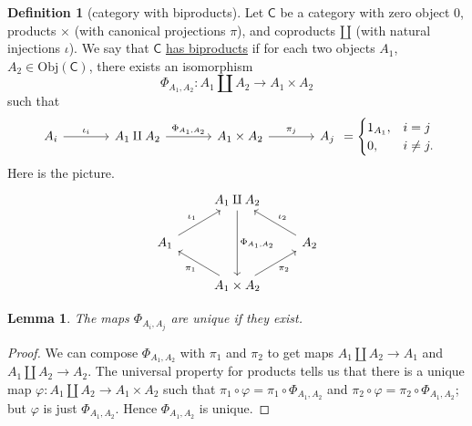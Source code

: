 \documentclass[a4paper]{report}
\newcommand{\defn}[1]{\ul{#1}}
\newcommand{\Obj}{\mathrm{Obj}}
\theoremstyle{definition}
\newtheorem{definition}{Definition}[section]
\theoremstyle{plain}
\newtheorem{lemma}{Lemma}[section]
\theoremstyle{remark}
\begin{document}
\begin{definition}[category with biproducts]
  \label{def:categorywithbiproducts}
  Let $\mathsf{C}$ be a category with zero object $0$, products $\times$ (with canonical projections $\pi$), and coproducts $\amalg$ (with natural injections $\iota$). We say that $\mathsf{C}$ \defn{has biproducts} if for each two objects $A_{1}$, $A_{2} \in \Obj(\mathsf{C})$, there exists an isomorphism
  \begin{equation*}
    \Phi_{A_{1}, A_{2}}\colon A_{1} \amalg A_{2} \to A_{1} \times A_{2}
  \end{equation*}
  such that 
  \begin{equation*}
    \begin{tikzcd}[column sep=large]
      A_{i}
      \arrow[r, "\iota_{i}"]
      & A_{1} \amalg A_{2} 
      \arrow[r, "{\Phi_{A_{1}, A_{2}}}"]
      & A_{1} \times A_{2}
      \arrow[r, "\pi_{j}"]
      & A_{j}
    \end{tikzcd}
    =
    \begin{cases}
      1_{A_{1}}, & i = j \\
      0, & i \neq j.
    \end{cases}
  \end{equation*}
  Here is the picture.
  \begin{equation*}
    \begin{tikzcd}
      & A_{1} \amalg A_{2} 
      \arrow[dd, "\Phi_{A_{1},A_{2}}"]
      \\
      A_{1} 
      \arrow[ur, "\iota_{1}"]
      & & A_{2}
      \arrow[ul, swap, "\iota_{2}"]
      \\
      & A_{1} \times A_{2}
      \arrow[ul, "\pi_{1}"]
      \arrow[ur, swap, "\pi_{2}"]
    \end{tikzcd}
  \end{equation*}
\end{definition}

\begin{lemma}
  The maps $\Phi_{A_{i}, A_{j}}$ are unique if they exist. 
\end{lemma}
\begin{proof}
  We can compose $\Phi_{A_{1}, A_{2}}$ with $\pi_{1}$ and $\pi_{2}$ to get maps $A_{1} \amalg A_{2} \to A_{1}$ and $A_{1} \amalg A_{2} \to A_{2}$. The universal property for products tells us that there is a unique map $\varphi\colon A_{1} \amalg A_{2} \to A_{1} \times A_{2}$ such that $\pi_{1} \circ \varphi = \pi_{1} \circ \Phi_{A_{1}, A_{2}}$ and $\pi_{2} \circ \varphi = \pi_{2} \circ \Phi_{A_{1}, A_{2}}$; but $\varphi$ is just $\Phi_{A_{1}, A_{2}}$. Hence $\Phi_{A_{1}, A_{2}}$ is unique.
\end{proof}
\end{document}
